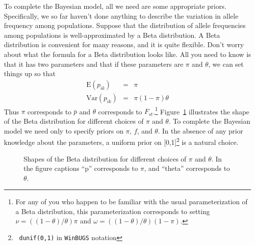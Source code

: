 \documentclass[12pt]{article}
\begin{document}
To complete the Bayesian model, all we need are some appropriate
priors. Specifically, we so far haven't done anything to describe the
variation in allele frequency among populations. Suppose that the
distribution of allele frequencies among populations is
well-approximated by a Beta distribution. A Beta
distribution is convenient for many reasons, and it is quite
flexible. Don't worry about what the formula for a Beta distribution
looks like. All you need to know is that it has two parameters and
that if these parameters are $\pi$ and $\theta$, we can set things up
so that
\begin{eqnarray*}
\mbox{E}(p_{ik}) &=& \pi \\
\mbox{Var}(p_{ik}) &=& \pi(1-\pi)\theta
\end{eqnarray*}
Thus $\pi$ corresponds to $\bar p$ and $\theta$ corresponds to
$F_{st}$.\footnote{For any of you who happen to be familiar with the
usual parameterization of a Beta distribution, this parameterization
corresponds to setting $\nu = ((1-\theta)/\theta)\pi$ and $\omega =
((1-\theta)/\theta)(1-\pi)$.} Figure~\ref{fig:beta} illustrates the
shape of the Beta distribution for different choices of $\pi$ and
$\theta$. To complete the Bayesian model we need only to specify
priors on $\pi$, $f$, and $\theta$. In the absence of any prior
knowledge about the parameters, a uniform prior on [0,1]\footnote{{\tt
dunif(0,1)} in {\tt WinBUGS} notation} is a natural choice.
\begin{figure}
\caption{Shapes of the Beta distribution for different choices of
  $\pi$ and $\theta$. In the figure captions ``p'' corresponds to $\pi$,
  and ``theta'' corresponds to $\theta$.}\label{fig:beta}
\end{figure}
\end{document}
